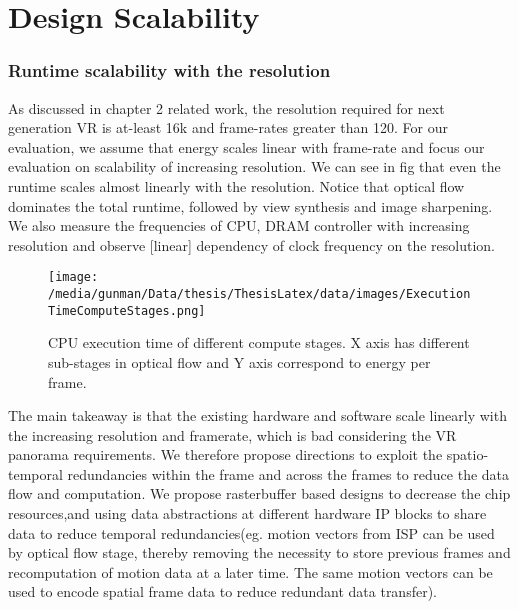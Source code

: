 \section{Design Scalability}	

\subsubsection{Runtime scalability with the resolution}
As discussed in chapter 2 related work, the resolution required for next generation VR is at-least 16k and frame-rates greater than 120. For our evaluation, we assume that energy scales linear with frame-rate and focus our evaluation on scalability of increasing resolution. We can see in fig that even the runtime scales almost linearly with the resolution. Notice that optical flow dominates the total runtime, followed by view synthesis and image sharpening. We also measure the frequencies of CPU, DRAM controller with increasing resolution and observe [linear] dependency of clock frequency on the resolution.
\begin{figure}[h]
	\begin{center}
		\texttt{[image: /media/gunman/Data/thesis/ThesisLatex/data/images/ExecutionTimeComputeStages.png]}
		\caption{CPU execution time of different compute stages. X axis has different sub-stages in optical flow and Y axis correspond to energy per frame.}
		\label{fig:ex_4_9}
	\end{center}
	\vspace{-0.3in}
\end{figure} 

The main takeaway is that the existing hardware and software scale linearly with the increasing resolution and framerate, which is bad considering the VR panorama requirements. We therefore propose directions to exploit the spatio-temporal redundancies within the frame and across the frames to reduce the data flow and computation. We propose rasterbuffer based designs to decrease the chip resources,and using data abstractions at different hardware IP blocks to share data to reduce temporal redundancies(eg. motion vectors from ISP can be used by optical flow stage, thereby removing the necessity to store previous frames and recomputation of motion data at a later time. The same motion vectors can be used to encode spatial frame data to reduce redundant data transfer).

